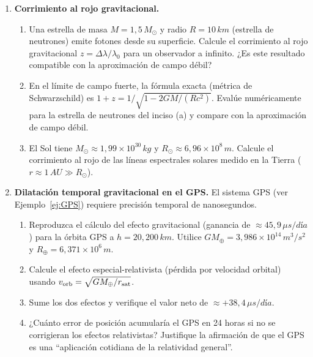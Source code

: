 \begin{enumerate}[leftmargin=2em, label=\textbf{P\thechapter.\arabic*.}]
  \item \textbf{Corrimiento al rojo gravitacional.}
  \begin{enumerate}[label=(\alph*)]
    \item Una estrella de masa $M = 1{,}5\,M_\odot$ y radio $R = 10\,\si{km}$ (estrella de neutrones) emite fotones desde su superficie. Calcule el corrimiento al rojo gravitacional $z = \Delta\lambda/\lambda_0$ para un observador a infinito. ¿Es este resultado compatible con la aproximación de campo débil?
    \item En el límite de campo fuerte, la fórmula exacta (métrica de Schwarzschild) es $1 + z = 1/\sqrt{1 - 2GM/(Rc^2)}$. Evalúe numéricamente para la estrella de neutrones del inciso (a) y compare con la aproximación de campo débil.
    \item El Sol tiene $M_\odot \approx 1{,}99\times10^{30}\,\si{kg}$ y $R_\odot \approx 6{,}96\times10^8\,\si{m}$. Calcule el corrimiento al rojo de las líneas espectrales solares medido en la Tierra ($r \approx 1\,\si{AU} \gg R_\odot$).
  \end{enumerate}

  \item \textbf{Dilatación temporal gravitacional en el GPS.}
  El sistema GPS (ver Ejemplo~\ref{ej:GPS}) requiere precisión temporal de nanosegundos.
  \begin{enumerate}[label=(\alph*)]
    \item Reproduzca el cálculo del efecto gravitacional (ganancia de $\approx 45{,}9\,\si{\mu s/día}$) para la órbita GPS a $h = 20{,}200\,\si{km}$. Utilice $GM_\oplus = 3{,}986\times10^{14}\,\si{m^3/s^2}$ y $R_\oplus = 6{,}371\times10^6\,\si{m}$.
    \item Calcule el efecto especial-relativista (pérdida por velocidad orbital) usando $v_{\rm orb} = \sqrt{GM_\oplus/r_{\rm sat}}$.
    \item Sume los dos efectos y verifique el valor neto de $\approx +38{,}4\,\si{\mu s/día}$.
    \item ¿Cuánto error de posición acumularía el GPS en 24 horas si no se corrigieran los efectos relativistas? Justifique la afirmación de que el GPS es una ``aplicación cotidiana de la relatividad general''.
  \end{enumerate}


\end{enumerate}
